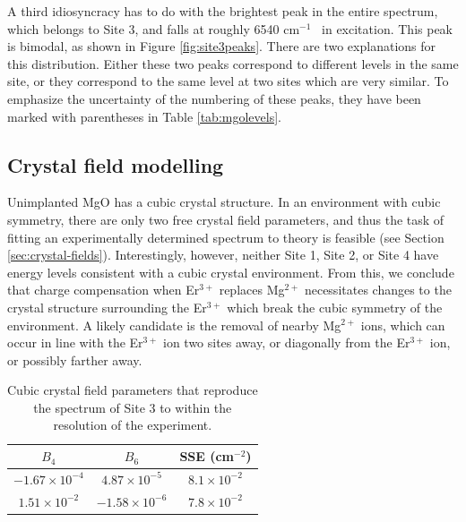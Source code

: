 \documentclass[12pt]{puthesis}
\newcommand{\erbium}[1][ ]{Er$^{3+}$#1}
\newcommand{\wn}[1][ ]{cm$^{-1}$#1}
\begin{document}
A third idiosyncracy has to do with the brightest peak in the entire spectrum, which belongs to Site 3, and falls at roughly 6540 \wn\ in excitation. This peak is bimodal, as shown in Figure \ref{fig:site3peaks}. There are two explanations for this distribution. Either these two peaks correspond to different levels in the same site, or they correspond to the same level at two sites which are very similar. To emphasize the uncertainty of the numbering of these peaks, they have been marked with parentheses in Table \ref{tab:mgolevels}.

\subsection{Crystal field modelling}
Unimplanted MgO has a cubic crystal structure. In an environment with cubic symmetry, there are only two free crystal field parameters, and thus the task of fitting an experimentally determined spectrum to theory is feasible (see Section \ref{sec:crystal-fields}). Interestingly, however, neither Site 1, Site 2, or Site 4 have energy levels consistent with a cubic crystal environment. From this, we conclude that charge compensation when \erbium replaces Mg$^{2+}$ necessitates changes to the crystal structure surrounding the \erbium which break the cubic symmetry of the environment. A likely candidate is the removal of nearby Mg$^{2+}$ ions, which can occur in line with the \erbium ion two sites away, or diagonally from the \erbium ion, or possibly farther away.

\begin{table}
  \centering
  \begin{tabular}{| c | c | c |}
    \hline
    $B_{4}$ & $B_{6}$ & SSE (cm$^{-2}$) \\
    \hline
    $-1.67\times 10^{-4}$ & $4.87\times 10^{-5}$ & $8.1\times 10^{-2}$ \\
    $1.51\times 10^{-2}$ & $-1.58\times 10^{-6}$ & $7.8\times 10^{-2}$\\
    \hline
  \end{tabular}
  \caption{Cubic crystal field parameters that reproduce the spectrum of Site 3 to within the resolution of the experiment.}
  \label{tab:crystalfieldparams}
\end{table}
\end{document}

